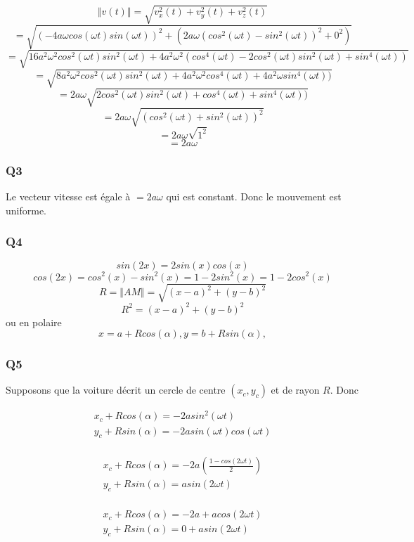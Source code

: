 \documentclass[]{book}
\theoremstyle{definition}
\begin{document}
$$\Vert v(t) \Vert = \sqrt{v_x^2(t) + v_y^2(t) + v_z^2(t)} $$
$$= \sqrt{(-4a\omega cos(\omega t) sin(\omega t))^ 2 + (2a\omega
  (cos^2(\omega t) - sin^2(\omega t))^2 + 0^2)}$$
$$= \sqrt{16a^2\omega^2 cos^2(\omega t) sin^2(\omega t) +
  4a^2\omega^2(cos^4(\omega t)-2cos^2(\omega t)sin^2(\omega t) + sin^4(\omega t))}$$
$$= \sqrt{8a^2\omega^2 cos^2(\omega t) sin^2(\omega t) +
  4a^2\omega^2cos^4(\omega t)+ 4a^2\omega sin^4(\omega t))}$$
$$= 2a\omega \sqrt{2cos^2(\omega t) sin^2(\omega t) +
  cos^4(\omega t)+ sin^4(\omega t))}$$
$$= 2a\omega \sqrt{(cos^2(\omega t) +sin^2(\omega t))^2}$$
$$= 2a\omega \sqrt{1^2}$$
$$= 2a\omega$$

\subsubsection*{Q3}
Le vecteur vitesse est \'egale \`a $= 2a\omega$ qui est constant. Donc
le mouvement est uniforme.

\subsubsection*{Q4}
$$sin(2x) = 2sin(x)cos(x)$$
$$cos(2x) = cos^2(x)-sin^2(x) = 1 - 2 sin^2(x) =  1 - 2 cos^2(x)$$
$$R=\Vert AM \Vert = \sqrt{(x-a)^2 + (y-b)^2}$$
$$R^2=(x-a)^2 + (y-b)^2$$
ou en polaire
$$ x = a + Rcos(\alpha), y = b + Rsin(\alpha), $$


\subsubsection*{Q5}
Supposons que la voiture d\'ecrit un cercle de centre $(x_c, y_c)$ et
de rayon $R$. Donc

$$
\begin{array}{l} 
  x_c + Rcos(\alpha) = -2asin^2( \omega t)\\
  y_c + Rsin(\alpha)= -2asin( \omega t)cos( \omega t)\\
\end{array}
$$

$$
\begin{array}{l} 
  x_c + Rcos(\alpha) = -2a(\frac{1-cos(2 \omega t)}{2})\\
  y_c + Rsin(\alpha)= asin( 2 \omega t)\\
\end{array}
$$

$$
\begin{array}{l} 
  x_c + Rcos(\alpha) = -2a + acos(2 \omega t)\\
  y_c + Rsin(\alpha)= 0+ asin( 2 \omega t)\\
\end{array}
$$
\end{document}
